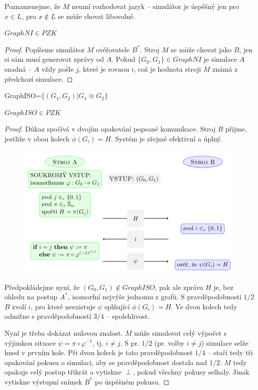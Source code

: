 Poznamenejme, že $M$ neumí rozhodovat jazyk -- simulátor je úspěšný jen pro $x \in L$, pro $x\not\in L$ se může chovat libovolně.

\begin{claim}
	$GraphNI \in PZK$
	\begin{proof}
		Popíšeme simulátor $M$ ověřovatele $B^*$. Stroj $M$ se může chovat jako $B$, jen si sám musí generovat zprávy od $A$. Pokud $\{G_0,G_1\} \in GraphNI$ je simulace $A$ snadná -- $A$ vždy pošle $j$, které je rovnou $i$, což je hodnota stroji $M$ známá z předchozí simulace.
	\end{proof}
\end{claim}

\begin{defn}
	GraphISO=$\{(G_1,G_2)|G_1\cong G_2\}$
\end{defn}

\begin{claim}
	$GraphISO \in PZK$
	\begin{proof}
		Důkaz spočívá v dvojím opakování popsané komunikace. Stroj $B$ přijme, jestliže v obou kolech $\phi(G_i)=H$. Systém je zřejmě efektivní a úplný.
		\begin{figure}[H]
			\centering
			\includegraphics[width=0.5\linewidth]{graph_iso}
		\end{figure}

		Předpokládejme nyní, že $(G_0,G_1)\not\in GraphISO$, pak ale zpráva $H$ je, bez ohledu na postup $A^*$, isomorfní nejvýše jednomu z grafů. S pravděpodobností $1/2$ $B$ zvolí $i$, pro které neexistuje $\psi$ splňující $\phi(G_i)=H$. Ve dvou kolech tedy odmítne s pravděpodobností $3/4$ -- spolehlivost.

		Nyní je třeba dokázat nulovou znalost. $M$ může simulovat celý výpočet s výjimkou situace $\psi=\pi\circ\varphi^{-1}$, tj. $i \neq j$. S pr. $1/2$ (pr. volby $i \neq j$) simulace selže hned v prvním kole. Při dvou kolech je tato pravděpodobnost $1/4$ -- stačí tedy tři opakování pokusu o simulaci, aby se pravděpodobnost dostala nad $1/2$. $M$ tedy opakuje celý postup třikrát a vytiskne $\perp$, pokud všechny pokusy selhaly. Jinak vytiskne výstupní snímek $B^*$ po úspěšném pokusu.
	\end{proof}
\end{claim}

